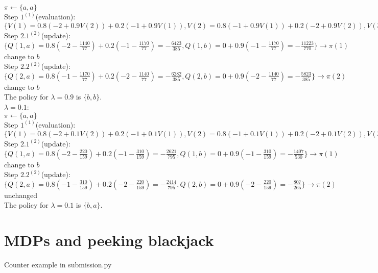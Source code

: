\documentclass[11pt]{article}
\begin{document}
\begin{onehalfspace}
\begin{itemize}
$\pi \leftarrow \{a, a\}$\\
Step $1^{(1)}$(evaluation): $\{V(1) = 0.8(-2+0.9V(2)) + 0.2(-1+0.9V(1)), V(2) = 0.8(-1+0.9V(1))+0.2(-2+0.9V(2)), V(3) = 0\} \rightarrow \{V(1) = -\frac{1170}{77}, V(2) = -\frac{1140}{77}\}$\\
Step $2.1^{(2)}$(update): $\{Q(1, a) = 0.8(-2 - \frac{1140}{77}) + 0.2(-1 - \frac{1170}{77}) = -\frac{6423}{385}, Q(1,b) = 0 + 0.9(-1-\frac{1170}{77}) = -\frac{11223}{770}\} \rightarrow \pi(1)$ change to $b$\\
Step $2.2^{(2)}$(update): $\{Q(2, a) = 0.8(-1 - \frac{1170}{77}) + 0.2(-2 - \frac{1140}{77}) = -\frac{6282}{385}, Q(2, b) = 0 + 0.9(-2-\frac{1140}{77})=-\frac{5823}{385}\} \rightarrow \pi(2)$ change to $b$\\
The policy for $\lambda = 0.9$ is $\{b,b\}$.
\\
$\lambda = 0.1$:\\
$\pi \leftarrow \{a, a\}$\\
Step $1^{(1)}$(evaluation): $\{V(1) = 0.8(-2+0.1V(2)) + 0.2(-1+0.1V(1)), V(2) = 0.8(-1+0.1V(1))+0.2(-2+0.1V(2)), V(3) = 0\} \rightarrow \{V(1) = -\frac{310}{159}, V(2) = -\frac{220}{159}\}$\\
Step $2.1^{(2)}$(update): $\{Q(1, a) = 0.8(-2 - \frac{220}{159}) + 0.2(-1 - \frac{310}{159}) = -\frac{2621}{795}, Q(1,b) = 0 + 0.9(-1-\frac{310}{159}) = -\frac{1407}{530}\} \rightarrow \pi(1)$ change to $b$\\
Step $2.2^{(2)}$(update): $\{Q(2, a) = 0.8(-1 - \frac{310}{159}) + 0.2(-2 - \frac{220}{159}) = -\frac{2414}{795}, Q(2, b) = 0 + 0.9(-2-\frac{220}{159})=-\frac{807}{265}\} \rightarrow \pi(2)$ unchanged\\
The policy for $\lambda = 0.1$ is $\{b,a\}$.
\end{itemize}
\section{MDPs and peeking blackjack}
Counter example in submission.py

\end{onehalfspace}
\end{document}
